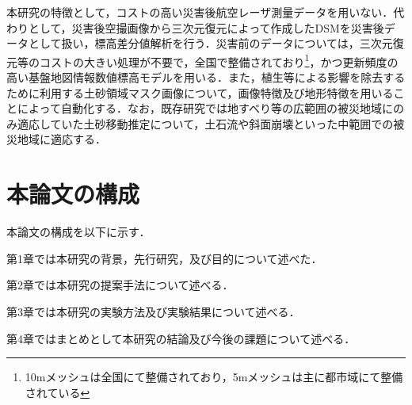     本研究の特徴として，コストの高い災害後航空レーザ測量データを用いない．代わりとして，災害後空撮画像から三次元復元によって作成したDSMを災害後データとして扱い，標高差分値解析を行う．災害前のデータについては，三次元復元等のコストの大きい処理が不要で，全国で整備されており\footnote{10mメッシュは全国にて整備されており，5mメッシュは主に都市域にて整備されている}，かつ更新頻度の高い基盤地図情報数値標高モデルを用いる．また，植生等による影響を除去するために利用する土砂領域マスク画像について，画像特徴及び地形特徴を用いることによって自動化する．なお，既存研究では地すべり等の広範囲の被災地域にのみ適応していた土砂移動推定について，土石流や斜面崩壊といった中範囲での被災地域に適応する．



  \section{本論文の構成}
    本論文の構成を以下に示す．
    
    第1章では本研究の背景，先行研究，及び目的について述べた．

    第2章では本研究の提案手法について述べる．

    第3章では本研究の実験方法及び実験結果について述べる．

    第4章ではまとめとして本研究の結論及び今後の課題について述べる．
